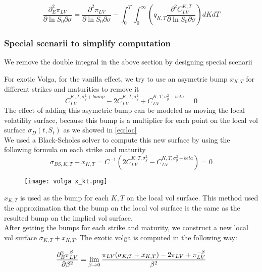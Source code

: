 \documentclass[12pt]{article}
\numberwithin{equation}{section}
\begin{document}
\begin{equation} \label{eq:5}
    \frac{\partial_E^2 \pi_{LV}}{\partial \ln S_0\partial \sigma}=\frac{\partial^2\pi_{LV}}{\partial \ln S_0\partial \sigma}
    -\int_0^T\int_0^\infty (q_{K,T}\frac{\partial^2 C^{K,T}_{LV}}{\partial \ln S_0\partial \sigma})dKdT
\end{equation} 
\subsubsection{Special scenarii to simplify computation}
We remove the double integral in the above section by designing special scenarii

For exotic Volga, for the vanilla effect, we try to use an asymetric bump $x_{K,T}$ for different strikes and maturities to remove it
\begin{equation} \label{eq:8}
    C_{LV}^{K,T,\sigma_y^2+bump}-2 C_{LV}^{K,T,\sigma_y^2}+C_{LV}^{K,T,\sigma_y^2-beta}=0
\end{equation} 
The effect of adding this asymetric bump can be modeled as moving the local volatility surface, because this bump is 
a multiplier for each point on the local vol surface $\sigma_D(t,S_t)$ as we showed in \ref{eq:loc}\\
We used a Black-Scholes solver to compute this new surface by using the following formula on each strike and maturity
\begin{equation} 
    \sigma_{BS,K,T}+x_{K,T}=C^{-1}(2 C_{LV}^{K,T,\sigma_y^2}-C_{LV}^{K,T,\sigma_y^2-beta})=0
\end{equation} 
\begin{figure}[h]
    \texttt{[image: volga x\_kt.png]}
\end{figure}
$x_{K,T}$ is used as the bump for each $K,T$ on the local vol surface.
This method used the approximation that the bump on the local vol surface is the same 
as the resulted bump on the implied vol surface.\\

After getting the bumps for each strike and maturity, we construct a new local vol surface $\sigma_{K,T}+x_{K,T}$.
The exotic volga is computed in the following way:

\begin{equation} \label{eq:6}
    \frac{\partial_E^2 \pi^\beta_{LV}}{\partial \beta^2}=\lim_{\beta \to 0}\frac{\pi_{LV}(\sigma_{K,T}+x_{K,T})-2\pi_{LV}+\pi_{LV}^{-\beta}}{\beta^2}\\
\end{equation} 
\end{document}
